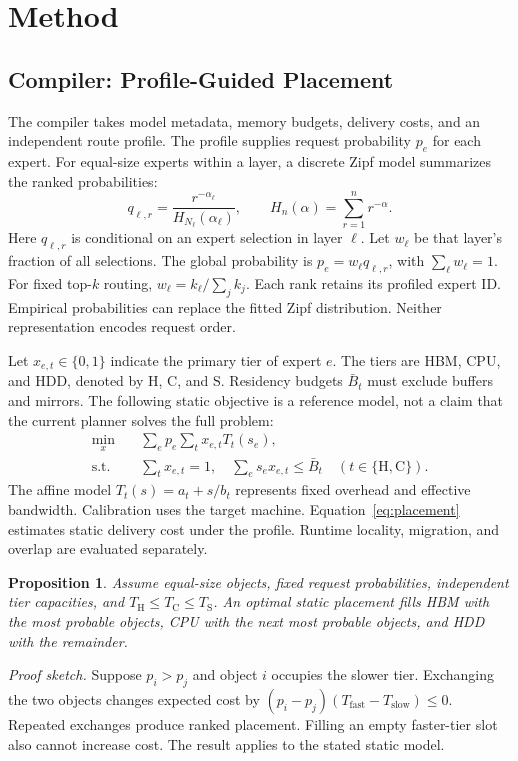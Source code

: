 \documentclass[conference,9pt,letterpaper]{IEEEtran}
\newtheorem{proposition}{Proposition}
\begin{document}
\section{Method}
\label{sec:method}
\subsection{Compiler: Profile-Guided Placement}
The compiler takes model metadata, memory budgets, delivery costs, and an independent route profile. The profile supplies request probability $p_e$ for each expert. For equal-size experts within a layer, a discrete Zipf model summarizes the ranked probabilities:
\begin{equation}
 q_{\ell,r}=\frac{r^{-\alpha_\ell}}{H_{N_\ell}(\alpha_\ell)},\qquad
 H_n(\alpha)=\sum_{r=1}^{n}r^{-\alpha}.
\end{equation}
Here $q_{\ell,r}$ is conditional on an expert selection in layer $\ell$. Let $w_\ell$ be that layer's fraction of all selections. The global probability is $p_e=w_\ell q_{\ell,r}$, with $\sum_\ell w_\ell=1$. For fixed top-$k$ routing, $w_\ell=k_\ell/\sum_j k_j$. Each rank retains its profiled expert ID. Empirical probabilities can replace the fitted Zipf distribution. Neither representation encodes request order.

Let $x_{e,t}\in\{0,1\}$ indicate the primary tier of expert $e$. The tiers are HBM, CPU, and HDD, denoted by $\mathrm H$, $\mathrm C$, and $\mathrm S$. Residency budgets $\bar B_t$ must exclude buffers and mirrors. The following static objective is a reference model, not a claim that the current planner solves the full problem:
\begin{align}
 \min_x\quad &\sum_e p_e\sum_t x_{e,t}T_t(s_e),\label{eq:placement}\\
 \text{s.t.}\quad&\sum_t x_{e,t}=1,\quad
 \sum_e s_e x_{e,t}\le \bar B_t\quad(t\in\{\mathrm H,\mathrm C\}).\nonumber
\end{align}
The affine model $T_t(s)=a_t+s/b_t$ represents fixed overhead and effective bandwidth. Calibration uses the target machine. Equation~\ref{eq:placement} estimates static delivery cost under the profile. Runtime locality, migration, and overlap are evaluated separately.

\begin{proposition}
Assume equal-size objects, fixed request probabilities, independent tier capacities, and $T_{\mathrm H}\le T_{\mathrm C}\le T_{\mathrm S}$. An optimal static placement fills HBM with the most probable objects, CPU with the next most probable objects, and HDD with the remainder.
\end{proposition}
\noindent\emph{Proof sketch.} Suppose $p_i>p_j$ and object $i$ occupies the slower tier. Exchanging the two objects changes expected cost by $(p_i-p_j)(T_{\mathrm{fast}}-T_{\mathrm{slow}})\le0$. Repeated exchanges produce ranked placement. Filling an empty faster-tier slot also cannot increase cost. The result applies to the stated static model.
\end{document}
